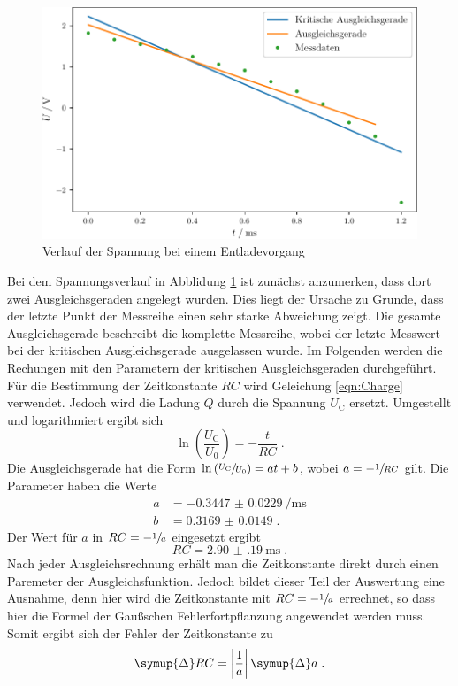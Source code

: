 \begin{figure}
        \centering
        \caption{Verlauf der Spannung bei einem Entladevorgang}
        \label{fig:discharge}
        \includegraphics{build/uct.pdf}
\end{figure}
\noindent Bei dem Spannungsverlauf in Abblidung \ref{fig:discharge} ist zunächst anzumerken, dass dort zwei Ausgleichsgeraden angelegt wurden. 
Dies liegt der Ursache zu Grunde, dass der letzte Punkt der Messreihe einen sehr starke Abweichung zeigt.
Die gesamte Ausgleichsgerade beschreibt die komplette Messreihe, wobei der letzte Messwert bei der kritischen Ausgleichsgerade ausgelassen wurde.
Im Folgenden werden die Rechungen mit den Parametern der kritischen Ausgleichsgeraden durchgeführt.
Für die Bestimmung der Zeitkonstante $RC$ wird Geleichung \eqref{eqn:Charge} verwendet.
Jedoch wird die Ladung $Q$ durch die Spannung $U_\text{C}$ ersetzt.
Umgestellt und logarithmiert ergibt sich 
\begin{equation}
    \ln \left( \frac{U_\text{C}}{U_0} \right ) =  - \frac{t}{RC} \; \text{.} 
\end{equation} 
Die Ausgleichsgerade hat die Form $ \ln \left( \sfrac{U_\text{C}}{U_0} \right ) = at + b$, wobei $a = - \sfrac{1}{RC}$ gilt.
Die Parameter haben die Werte 
\begin{align*}
    a &= \SI{-0.3447(229)}{\per\milli\second} \\
    b &= \num{0.3169(149)} \; \text{.}
\end{align*}
Der Wert für $a$ in $RC = - \sfrac{1}{a}$ eingesetzt ergibt
\begin{equation*}
   RC = \SI{2.90(19)}{\milli\second} \; \text{.}
\end{equation*}
Nach jeder Ausgleichsrechnung erhält man die Zeitkonstante direkt durch einen Paremeter der Ausgleichsfunktion.
Jedoch bildet dieser Teil der Auswertung eine Ausnahme, denn hier wird die Zeitkonstante mit $RC = - \sfrac{1}{a}$ errechnet, so dass hier die Formel der Gaußschen
Fehlerfortpflanzung angewendet werden muss.
Somit ergibt sich der Fehler der Zeitkonstante zu 
\begin{equation}
    \symup{\Delta} RC = \abs*{\frac{1}{a}} \, \symup{\Delta} a \; \text{.}
\end{equation}
